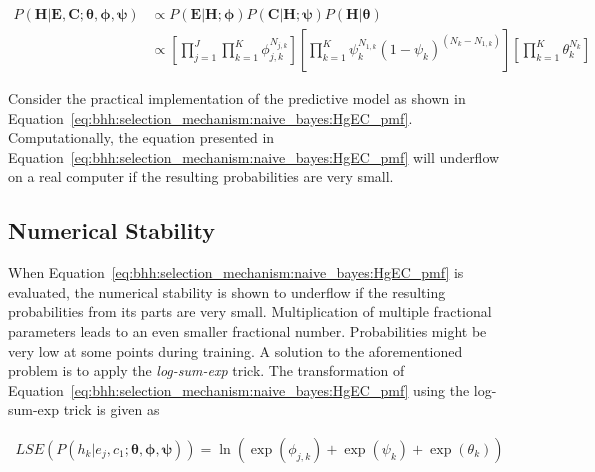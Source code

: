 \documentclass[preprint,review,12pt]{elsarticle}
\begin{document}
\begin{equation}
	\label{eq:bhh:selection_mechanism:naive_bayes:HgEC_pmf}
	\begin{split}
		P(\boldsymbol{H} \vert \boldsymbol{E}, \boldsymbol{C};  \boldsymbol{\theta}, \boldsymbol{\phi}, \boldsymbol{\psi})
		&\propto P(\boldsymbol{E} \vert \boldsymbol{H};  \boldsymbol{\phi})  P(\boldsymbol{C} \vert \boldsymbol{H}; \boldsymbol{\psi}) P(\boldsymbol{H} \vert \boldsymbol{\theta})  \\
		&\propto \left[ \prod_{j=1}^{J} \prod_{k=1}^{K} \phi_{j,k}^{N_{j,k}} \right] \left[ \prod_{k=1}^{K} \psi_{k}^{N_{1,k}} (1 - \psi_{k})^{(N_{k} - N_{1,k})} \right] \left[ \prod_{k=1}^{K} \theta_{k}^{N_{k}} \right]
	\end{split}
\end{equation}

Consider the practical implementation of the predictive model as shown in Equation~\eqref{eq:bhh:selection_mechanism:naive_bayes:HgEC_pmf}. Computationally, the equation presented in Equation~\eqref{eq:bhh:selection_mechanism:naive_bayes:HgEC_pmf} will underflow on a real computer if the resulting probabilities are very small.

\subsection{Numerical Stability}\label{sec:bhh:selection_mechanism:numerical_stability}

When Equation~\eqref{eq:bhh:selection_mechanism:naive_bayes:HgEC_pmf} is evaluated, the numerical stability is shown to underflow if the resulting probabilities from its parts are very small. Multiplication of multiple fractional parameters leads to an even smaller fractional number. Probabilities might be very low at some points during training. A solution to the aforementioned problem is to apply the \textit{log-sum-exp} trick. The transformation of Equation~\eqref{eq:bhh:selection_mechanism:naive_bayes:HgEC_pmf} using the log-sum-exp trick is given as

\begin{equation}
	\label{eq:bhh:selection_mechanism:numerical_stability:log_sum_exp}
	\begin{split}
		LSE(P(h_{k} \vert e_{j}, c_{1};  \boldsymbol{\theta}, \boldsymbol{\phi}, \boldsymbol{\psi})) = \ln(\exp(\phi_{j,k}) +  \exp(\psi_{k}) + \exp(\theta_{k}))
	\end{split}
\end{equation}



\end{document}
